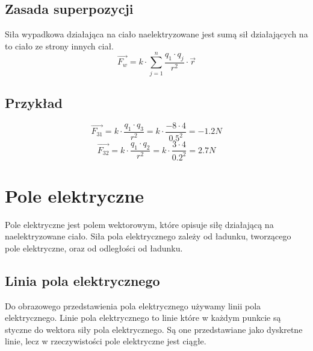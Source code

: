 \documentclass{../notatki}
\begin{document}
\subsection{Zasada superpozycji}

Siła wypadkowa działająca na ciało naelektryzowane jest sumą sił
działających na to ciało ze strony innych ciał.
$$
\vec{F_w} = k \cdot \sum_{j=1}^{n} \frac{q_1 \cdot q_j}{r^2} \cdot \vec{r}
$$

\subsection{Przykład}

\begin{figure}[h]
  \centering
\end{figure}
$$
\vec{F_{31}} = k \cdot \frac{q_1 \cdot q_3}{r^2} = k \cdot \frac{-8\cdot
4}{0.5^2} = -1.2 N
$$
$$
\vec{F_{32}} = k \cdot \frac{q_1 \cdot q_2}{r^2} = k \cdot \frac{3\cdot
4}{0.2^2} = 2.7 N
$$

\section{Pole elektryczne}

Pole elektryczne jest polem wektorowym, które opisuje siłę działającą na
naelektryzowane ciało. Siła pola elektrycznego zależy od ładunku,
tworzącego pole elektryczne, oraz od odległości od ładunku.

\subsection{Linia pola elektrycznego}

Do obrazowego przedstawienia pola elektrycznego używamy linii pola
elektrycznego. Linie pola elektrycznego to linie które w każdym punkcie są
styczne do wektora siły pola elektrycznego. Są one przedstawiane jako dyskretne
linie, lecz w rzeczywistości pole elektryczne jest ciągłe.
\end{document}
